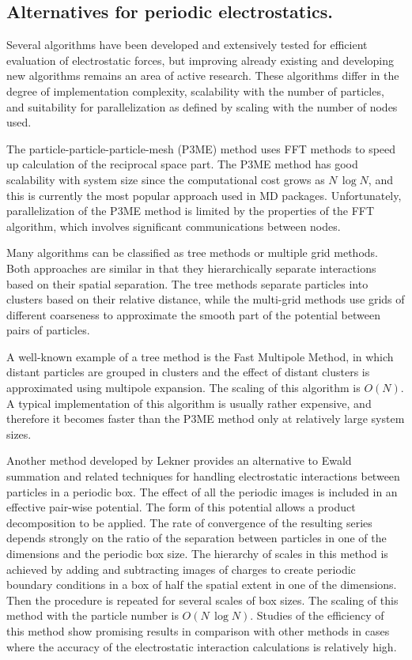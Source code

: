 \documentclass[doublespacing]{elsart}
\begin{document}
\subsection{Alternatives for periodic electrostatics.}

Several algorithms have been developed and extensively tested for
efficient evaluation of electrostatic forces, but improving already
existing and developing new algorithms remains an area of active
research. These algorithms differ in the degree of implementation
complexity, scalability with the number of particles, and suitability
for parallelization as defined by scaling with the number of nodes
used.

The particle-particle-particle-mesh (P3ME) method\cite{hockney:1988}
uses FFT methods to speed up calculation of the reciprocal space part.
The P3ME method has good scalability with system size since the computational
cost grows as $N\,\log N$, and this is currently the most popular approach 
used in MD packages. Unfortunately, parallelization of the
P3ME method is limited by the properties of the FFT algorithm, which
involves significant communications between nodes.

Many algorithms can be classified as 
tree methods or multiple grid methods. Both approaches are
similar in that they hierarchically separate interactions based on
their spatial separation. The tree methods separate particles into
clusters based on their relative distance, while the multi-grid methods use
grids of different coarseness to approximate the smooth part of the
potential between pairs of particles.

A well-known example of a tree method is the Fast Multipole
Method\cite{greengard:87}, in which distant particles are grouped in
clusters and the effect of distant clusters is approximated using
multipole expansion. The scaling of this algorithm is $O(N)$. A
typical implementation of this algorithm is usually rather expensive,
and therefore it becomes faster than the P3ME method only at
relatively large system sizes.

Another method developed by Lekner\cite{lekner:1991} provides an
alternative to Ewald summation and related techniques for handling
electrostatic interactions between particles in a periodic box. The
effect of all the periodic images is included in an effective
pair-wise potential. The form of this potential allows a product
decomposition to be applied\cite{sperb:1999}. The rate of convergence of
the resulting series depends strongly on the ratio of the separation
between particles in one of the dimensions and the periodic box
size. The hierarchy of scales in this method is achieved by adding and
subtracting images of charges to create periodic boundary conditions
in a box of half the spatial extent in one of the dimensions. Then the
procedure is repeated for several scales of box sizes.  The scaling of
this method with the particle number is $O(N\,\log N)$. Studies of the
efficiency of this method show promising results in comparison with
other methods in cases where the accuracy of the electrostatic
interaction calculations is relatively high\cite{strebel:2001}.
\end{document}
